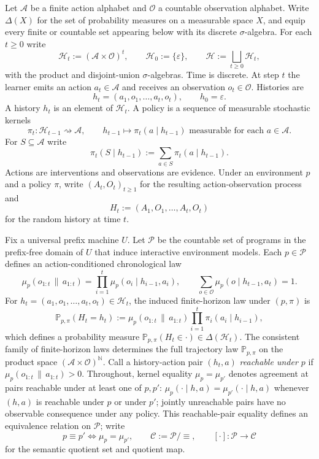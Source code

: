 \documentclass[11pt]{article}
\theoremstyle{definition}
\theoremstyle{remark}
\newcommand{\Acal}{\mathcal{A}}
\newcommand{\Ccal}{\mathcal{C}}
\newcommand{\Ocal}{\mathcal{O}}
\newcommand{\Pcal}{\mathcal{P}}
\newcommand{\Hcal}{\mathcal{H}}
\newcommand{\Prob}{\mathbb{P}}
\newcommand{\givena}{\,\|\,}
\begin{document}
Let $\Acal$ be a finite action alphabet and $\Ocal$ a countable observation alphabet. Write $\Delta(X)$ for the set of probability measures on a measurable space $X$, and equip every finite or countable set appearing below with its discrete $\sigma$-algebra. For each $t\ge 0$ write
\[
\Hcal_t:=(\Acal\times\Ocal)^t,
\qquad
\Hcal_0:=\{\varepsilon\},
\qquad
\Hcal:=\bigsqcup_{t\ge 0}\Hcal_t,
\]
with the product and disjoint-union $\sigma$-algebras. Time is discrete. At step $t$ the learner emits an action $a_t\in\Acal$ and receives an observation $o_t\in\Ocal$. Histories are
\[
h_t=(a_1,o_1,\dots,a_t,o_t),
\qquad
h_0=\varepsilon.
\]
A history $h_t$ is an element of $\Hcal_t$. A policy is a sequence of measurable stochastic kernels
\[
\pi_t:\Hcal_{t-1}\rightsquigarrow \Acal,
\qquad
h_{t-1}\longmapsto \pi_t(a\mid h_{t-1})\text{ measurable for each }a\in\Acal.
\]
For $S\subseteq\Acal$ write
\[
\pi_t(S\mid h_{t-1}):=\sum_{a\in S}\pi_t(a\mid h_{t-1}).
\]
Actions are interventions and observations are evidence. Under an environment $p$ and a policy $\pi$, write $(A_t,O_t)_{t\ge 1}$ for the resulting action-observation process and
\[
H_t:=(A_1,O_1,\dots,A_t,O_t)
\]
for the random history at time $t$.

Fix a universal prefix machine $U$. Let $\Pcal$ be the countable set of programs in the prefix-free domain of $U$ that induce interactive environment models. Each $p\in\Pcal$ defines an action-conditioned chronological law
\[
\mu_p(o_{1:t}\givena a_{1:t})
=
\prod_{i=1}^{t}\mu_p(o_i\mid h_{i-1},a_i),
\qquad
\sum_{o\in\Ocal}\mu_p(o\mid h_{t-1},a_t)=1.
\]
For $h_t=(a_1,o_1,\dots,a_t,o_t)\in\Hcal_t$, the induced finite-horizon law under $(p,\pi)$ is
\[
\Prob_{p,\pi}(H_t=h_t)
:=
\mu_p(o_{1:t}\givena a_{1:t})\prod_{i=1}^t \pi_i(a_i\mid h_{i-1}),
\]
which defines a probability measure $\Prob_{p,\pi}(H_t\in\cdot)\in\Delta(\Hcal_t)$. The consistent family of finite-horizon laws determines the full trajectory law $\Prob_{p,\pi}$ on the product space $(\Acal\times\Ocal)^{\mathbb N}$. Call a history-action pair $(h_t,a)$ \emph{reachable under $p$} if $\mu_p(o_{1:t}\givena a_{1:t})>0$. Throughout, kernel equality $\mu_p=\mu_{p'}$ denotes agreement at pairs reachable under at least one of $p,p'$: $\mu_p(\cdot\mid h,a)=\mu_{p'}(\cdot\mid h,a)$ whenever $(h,a)$ is reachable under $p$ or under $p'$; jointly unreachable pairs have no observable consequence under any policy. This reachable-pair equality defines an equivalence relation on $\Pcal$; write
\[
p\equiv p'
\iff
\mu_p=\mu_{p'},
\qquad
\Ccal:=\Pcal/\!\equiv,
\qquad
[\cdot]:\Pcal\to\Ccal
\]
for the semantic quotient set and quotient map.
\end{document}
